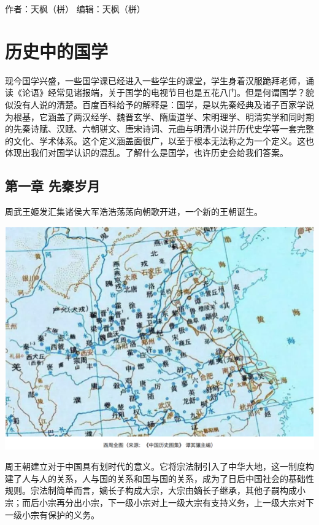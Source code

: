 \documentclass[]{book}
\begin{document}
作者：天枫（栟）
编辑：天枫（栟）

\hypertarget{ux5386ux53f2ux4e2dux7684ux56fdux5b66}{%
\section{历史中的国学}\label{ux5386ux53f2ux4e2dux7684ux56fdux5b66}}

现今国学兴盛，一些国学课已经进入一些学生的课堂，学生身着汉服跪拜老师，诵读《论语》经常见诸报端，关于国学的电视节目也是五花八门。但是何谓国学？貌似没有人说的清楚。百度百科给予的解释是：国学，是以先秦经典及诸子百家学说为根基，它涵盖了两汉经学、魏晋玄学、隋唐道学、宋明理学、明清实学和同时期的先秦诗赋、汉赋、六朝骈文、唐宋诗词、元曲与明清小说并历代史学等一套完整的文化、学术体系。这个定义涵盖面很广，以至于根本无法称之为一个定义。这也体现出我们对国学认识的混乱。了解什么是国学，也许历史会给我们答案。

\hypertarget{ux7b2cux4e00ux7ae0-ux5148ux79e6ux5c81ux6708}{%
\subsection{第一章 先秦岁月}\label{ux7b2cux4e00ux7ae0-ux5148ux79e6ux5c81ux6708}}

周武王姬发汇集诸侯大军浩浩荡荡向朝歌开进，一个新的王朝诞生。

\includegraphics[width=8.33in]{images/gx1}

周王朝建立对于中国具有划时代的意义。它将宗法制引入了中华大地，这一制度构建了人与人的关系，人与国的关系和国与国的关系，成为了日后中国社会的基础性规则。宗法制简单而言，嫡长子构成大宗，大宗由嫡长子继承，其他子嗣构成小宗；而后小宗再分出小宗，下一级小宗对上一级大宗有支持义务，上一级大宗对下一级小宗有保护的义务。
\end{document}
